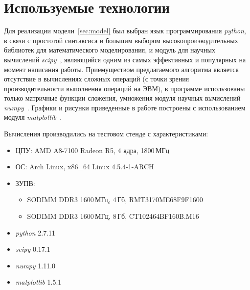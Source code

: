 \section{Используемые технологии}

Для реализации модели~\ref{sec:model} был выбран язык программирования
\emph{python}, в связи с простотой синтаксиса и большим выбором
высокопроизводительных библиотек для математического моделирования, и модуль
для научных вычислений \emph{scipy}~\cite{scipy}, являющийся одним из самых
эффективных и популярных на момент написания работы.  Приемуществом
предлагаемого алгоритма является отсутствие в вычислениях сложных операций (с
точки зрения производительности выполнения операций на ЭВМ), в программе
использованы только матричные функции сложения, умножения модуля научных
вычислений \emph{numpy}~\cite{numpy}.  Графики и рисунки приведенные в работе
построены с использованием модуля \emph{matplotlib}~\cite{matplotlib}.

Вычисления производились на тестовом стенде с характеристиками:
\begin{itemize}
    \item ЦПУ: AMD A8-7100 Radeon R5, 4 ядра, 1800\,МГц
    \item ОС: Arch Linux, x86\_64 Linux 4.5.4-1-ARCH
    \item ЗУПВ:
        \begin{itemize}
            \item SODIMM DDR3 1600\,МГц, 4\,Гб, RMT3170ME68F9F1600
            \item SODIMM DDR3 1600\,МГц, 8\,Гб, CT102464BF160B.M16
        \end{itemize}
    \item \emph{python} 2.7.11
    \item \emph{scipy} 0.17.1
    \item \emph{numpy} 1.11.0
    \item \emph{matplotlib} 1.5.1
\end{itemize}

